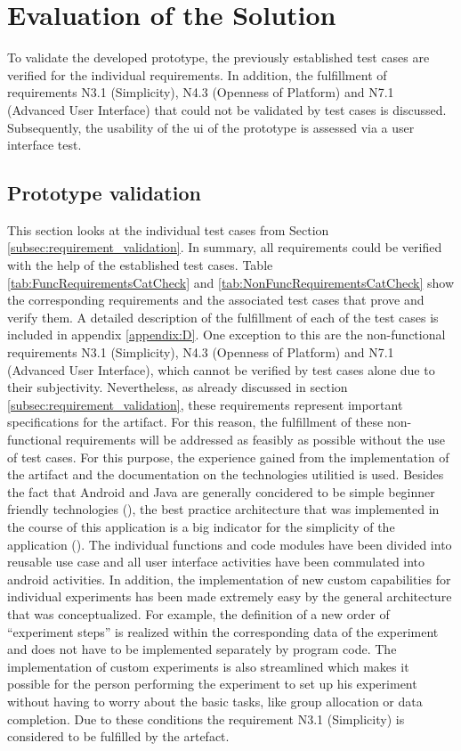 \section{Evaluation of the Solution}

To validate the developed prototype, the previously established test cases are verified for the individual requirements. In addition, the fulfillment of requirements N3.1 (Simplicity), N4.3 (Openness of Platform) and N7.1 (Advanced User Interface) that could not be validated by test cases is discussed. Subsequently, the usability of the \ac{ui} of the prototype is assessed via a user interface test.

\subsection{Prototype validation}

This section looks at the individual test cases from Section \ref{subsec:requirement_validation}. In summary, all requirements could be verified with the help of the established test cases. Table \ref{tab:FuncRequirementsCatCheck} and \ref{tab:NonFuncRequirementsCatCheck} show the corresponding requirements and the associated test cases that prove and verify them. A detailed description of the fulfillment of each of the test cases is included in appendix \ref{appendix:D}. One exception to this are the non-functional requirements N3.1 (Simplicity), N4.3 (Openness of Platform) and N7.1 (Advanced User Interface), which cannot be verified by test cases alone due to their subjectivity. Nevertheless, as already discussed in section \ref{subsec:requirement_validation}, these requirements represent important specifications for the artifact. For this reason, the fulfillment of these non-functional requirements will be addressed as feasibly as possible without the use of test cases. For this purpose, the experience gained from the implementation of the artifact and the documentation on the technologies utilitied is used. Besides the fact that Android and Java are generally concidered to be simple beginner friendly technologies (\cite{Ullenboom.2017}), the best practice architecture that was implemented in the course of this application is a big indicator for the simplicity of the application (\cite{Google.2023}). The individual functions and code modules have been divided into reusable use case and all user interface activities have been commulated into android activities. In addition, the implementation of new custom capabilities for individual experiments has been made extremely easy by the general architecture that was conceptualized. For example, the definition of a new order of \enquote{experiment steps} is realized within the corresponding data of the experiment and does not have to be implemented separately by program code. The implementation of custom experiments is also streamlined which makes it possible for the person performing the experiment to set up his experiment without having to worry about the basic tasks, like group allocation or data completion. Due to these conditions the requirement N3.1 (Simplicity) is considered to be fulfilled by the artefact.

